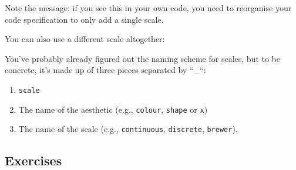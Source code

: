 Note the message: if you see this in your own code, you need to
reorganise your code specification to only add a single scale.

You can also use a different scale altogether:

\begin{Shaded}
\begin{Highlighting}[]
\StringTok{ }
\StringTok{  }\NormalTok{(}\NormalTok{(} 
\StringTok{  }\NormalTok{() +}\StringTok{ }
\StringTok{  }\NormalTok{()}
\end{Highlighting}
\end{Shaded}

You've probably already figured out the naming scheme for scales, but to
be concrete, it's made up of three pieces separated by ``\_``:

\begin{enumerate}
\def\labelenumi{\arabic{enumi}.}
\tightlist
\item
  \texttt{scale}
\item
  The name of the aesthetic (e.g., \texttt{colour}, \texttt{shape} or
  \texttt{x})
\item
  The name of the scale (e.g., \texttt{continuous}, \texttt{discrete},
  \texttt{brewer}).
\end{enumerate}

\subsection{Exercises}\label{exercises}

